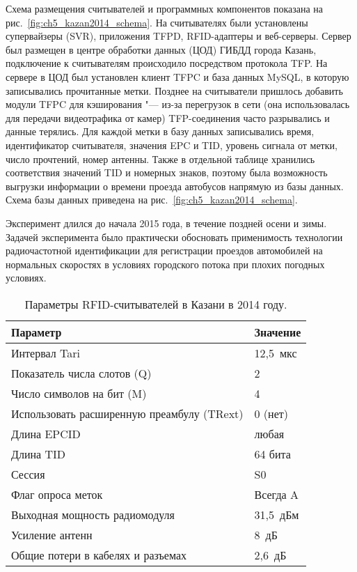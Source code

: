 Схема размещения считывателей и программных компонентов показана на рис.~\ref{fig:ch5_kazan2014_schema}. На считывателях были установлены супервайзеры (SVR), приложения TFPD, RFID-адаптеры и веб-серверы. Сервер был размещен в центре обработки данных (ЦОД) ГИБДД города Казань, подключение к считывателям происходило посредством протокола TFP.  На сервере в ЦОД был установлен клиент TFPC и база данных MySQL, в которую записывались прочитанные метки. Позднее на считыватели пришлось добавить модули TFPC для кэширования "--- из-за перегрузок в сети (она использовалась для передачи видеотрафика от камер) TFP-соединения часто разрывались и данные терялись. Для каждой метки в базу данных записывались время, идентификатор считывателя, значения EPC и TID, уровень сигнала от метки, число прочтений, номер антенны. Также в отдельной таблице хранились соответствия значений TID и номерных знаков, поэтому была возможность выгрузки информации о времени проезда автобусов напрямую из базы данных. Схема базы данных приведена на рис.~\ref{fig:ch5_kazan2014_schema}.

Эксперимент длился до начала 2015 года, в течение поздней осени и зимы. Задачей эксперимента было практически обосновать применимость технологии радиочастотной идентификации для регистрации проездов автомобилей на нормальных скоростях в условиях городского потока при плохих погодных условиях.

\begin{table}[!t]
	\renewcommand{\arraystretch}{1.3}
	\caption{Параметры RFID-считывателей в Казани в 2014 году.}
	\label{table:ch5_kazan_rfid_settings}
	\centering
	\begin{tabular}{|l|l|}
		\hline
		Параметр                                   & Значение   \\\hline
		Интервал Tari                              & 12,5~мкс   \\
		Показатель числа слотов (Q)                & 2          \\
		Число символов на бит (M)                  & 4          \\
		Использовать расширенную преамбулу (TRext) & 0 (нет)    \\
		Длина EPCID                                & любая      \\
		Длина TID                                  & 64 бита    \\
		Сессия                                     & S0         \\
		Флаг опроса меток                          & Всегда A   \\
    Выходная мощность радиомодуля              & 31,5~дБм   \\
    Усиление антенн                            & 8~дБ       \\
    Общие потери в кабелях и разъемах          & 2,6~дБ     \\\hline
	\end{tabular}
\end{table}

